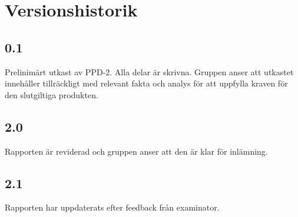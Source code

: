 \section*{Versionshistorik}

\subsection*{0.1}
Prelinimärt utkast av PPD-2. Alla delar är skrivna. Gruppen anser att utkastet innehåller tillräckligt med relevant fakta och analys för att uppfylla kraven för den slutgiltiga produkten.

\subsection*{2.0}
Rapporten är reviderad och gruppen anser att den är klar för inlämning.

\subsection*{2.1}
Rapporten har uppdaterats efter feedback från examinator.
